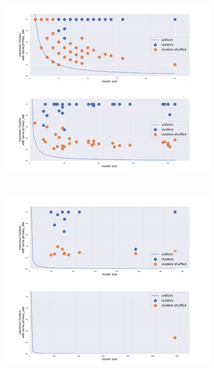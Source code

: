 \begin{figure}[htb!]
    \centering
    \begin{minipage}{0.45\textwidth}
    \includegraphics[width=0.9\linewidth]{pictures/topic/gtex/oversigma_10tissue/shuffledclusterhomosize_l1_primary_site.pdf}
    \end{minipage}
    \hspace{3mm}
    \begin{minipage}{0.45\textwidth}
    \includegraphics[width=0.9\linewidth]{pictures/topic/gtex/oversigma_10tissue/shuffledclusterhomosize_l2_primary_site.pdf}
    \end{minipage}
    \\
    \begin{minipage}{0.45\textwidth}
    \includegraphics[width=0.9\linewidth]{pictures/topic/gtex/oversigma_10tissue/shuffledclusterhomosize_l3_primary_site.pdf}
    \end{minipage}
    \hspace{3mm}
    \begin{minipage}{0.45\textwidth}
    \includegraphics[width=0.9\linewidth]{pictures/topic/gtex/oversigma_10tissue/shuffledclusterhomosize_l4_primary_site.pdf}
    \end{minipage}
\end{figure}


